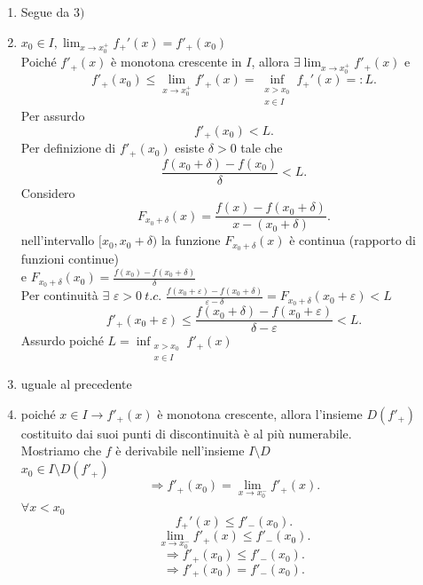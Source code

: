 \documentclass[12px]{article}
\begin{document}
\begin{dimo}
\begin{enumerate}
\item Segue da $3)$
\item  $x_0\in I, \lim_{x \rightarrow x_0^+} f_+'(x) = f'_+(x_0)$ \\
	Poiché $f'_+(x)$ è monotona crescente in $I$, allora $\exists \lim_{x \rightarrow x_0^+}f'_+(x)$ e
	\[
		f'_+(x_0)\leq\lim_{x \rightarrow x_0^+}f'_+(x) =  \inf_{\substack{x>x_0\\x\in I}} f_+'(x)=: L
	.\] 
	Per assurdo 
	\[
f'_+(x_0) < L
	.\] 
	Per definizione di $f'_+(x_0)$ esiste $\delta > 0 $ tale che 
	 \[
		 \frac{f(x_0 + \delta)-f(x_0)}{\delta} < L
	.\] 
	Considero
	\[
		F_{x_0+\delta}(x) = \frac{f(x) - f(x_0+\delta)}{x-(x_0+\delta)}
	.\] 
	nell'intervallo $[x_0,x_0+\delta)$ la funzione $F_{x_0 + \delta}(x)$ è continua (rapporto di funzioni continue)\\
	e $\displaystyle F_{x_0+\delta}(x_0) = \frac{f(x_0) - f(x_0 + \delta)}{\delta}$\\
	Per continuità $\displaystyle\exists$  $\varepsilon > 0 \ t.c.$  $\frac{f(x_0 + \varepsilon) - f(x_0+\delta)}{\varepsilon-\delta}=F_{x_0 + \delta}(x_0+\varepsilon)< L$
	\[
		f'_+(x_0+ \varepsilon)\leq\frac{f(x_0 + \delta)-f(x_0+ \varepsilon)}{\delta - \varepsilon} < L
	.\] 
	Assurdo poiché $L = \inf_{\substack{x > x_0\\x\in I}}f'_+(x)$
\item uguale al precedente
\item poiché  $x\in I \rightarrow f'_+(x)$ è monotona crescente, allora l'insieme $D(f'_+)$ costituito dai suoi punti di discontinuità è al più numerabile.\\
	Mostriamo che  $f$ è derivabile nell'insieme $I\setminus D$\\
	$x_0\in I\setminus D(f'_+)$\\
	\[
		\Rightarrow  f'_+(x_0) = \lim_{x \rightarrow x_0^-}f'_+(x)
	.\] 
	$\forall x < x_0$ 
	\[
	f_+'(x)\leq f'_-(x_0)
	.\]
	\[
		\lim_{x \rightarrow x_0^-}f'_+(x)\leq f'_-(x_0)
	.\] 
	\[
	\Rightarrow f'_+(x_0)\leq f'_-(x_0)
	.\] 
	\[
	\Rightarrow f'_+(x_0) = f'_-(x_0)
	.\] 
		 \end{enumerate}
	 \end{dimo}
\end{document}
